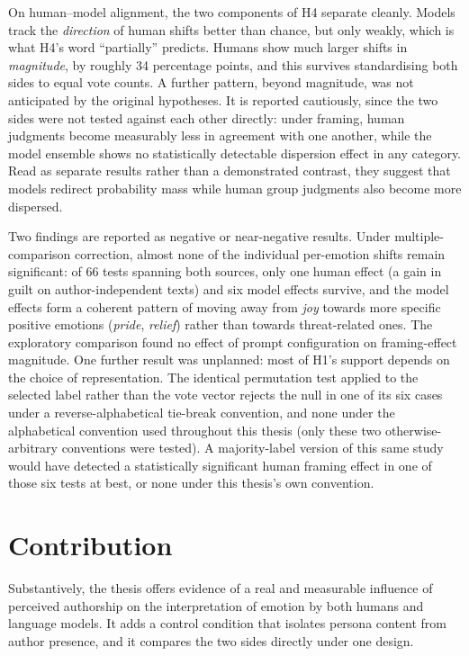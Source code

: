 On human--model alignment, the two components of H4 separate cleanly. Models track the
\emph{direction} of human shifts better than chance, but only weakly, which is what H4's word
``partially'' predicts. Humans show much larger shifts in \emph{magnitude}, by roughly 34
percentage points, and this survives standardising both sides to equal vote counts. A further
pattern, beyond magnitude, was not anticipated by the original hypotheses. It is reported
cautiously, since the two sides were not tested against each other directly: under framing, human
judgments become measurably less in agreement with one another, while the model ensemble shows no statistically
detectable dispersion effect in any category. Read as separate results rather than a demonstrated
contrast, they suggest that models redirect probability mass while human group judgments also
become more dispersed.

Two findings are reported as negative or near-negative results. Under multiple-comparison
correction, almost none of the individual per-emotion shifts remain significant: of 66 tests
spanning both sources, only one human effect (a gain in guilt on author-independent texts) and six
model effects survive, and the model effects form a coherent pattern of moving away from
\emph{joy} towards more specific positive emotions (\emph{pride}, \emph{relief}) rather than towards
threat-related ones. The exploratory comparison found no effect of prompt configuration on
framing-effect magnitude. One further result was unplanned: most of H1's support depends on the
choice of representation. The identical permutation test applied to the selected label rather than
the vote vector rejects the null in one of its six cases under a reverse-alphabetical tie-break
convention, and none under the alphabetical convention used throughout this thesis (only these two
otherwise-arbitrary conventions were tested). A majority-label version of this same study would
have detected a statistically significant human framing effect in one of those six tests at best,
or none under this thesis's own convention.

\section{Contribution}
\label{conc:contribution}

\noindent
Substantively, the thesis offers evidence of a real and measurable influence of perceived
authorship on the interpretation of emotion by both humans and language models. It adds a control
condition that isolates persona content from author presence, and it compares the two sides
directly under one design.

